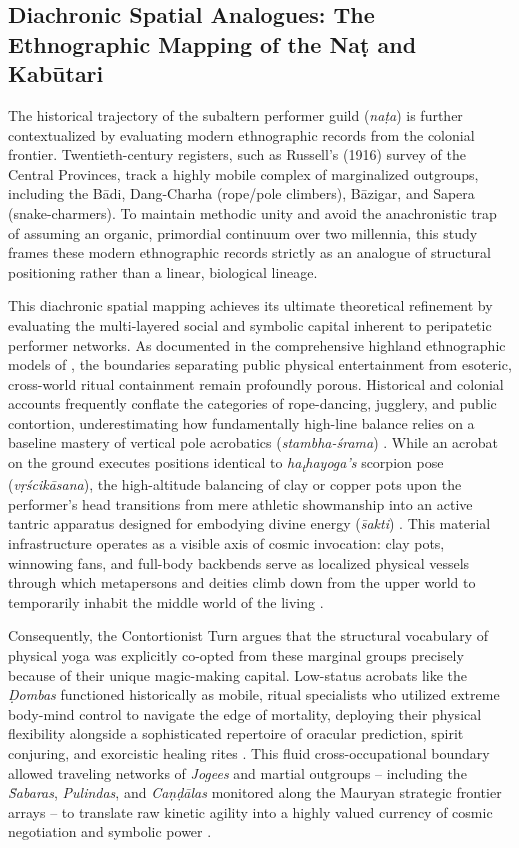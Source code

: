 \documentclass[11pt,twoside,letterpaper]{article}
\begin{document}
\subsection{Diachronic Spatial Analogues: The Ethnographic Mapping of the Naṭ and Kabūtari}

The historical trajectory of the subaltern performer guild (\textit{naṭa}) is further contextualized by evaluating modern ethnographic records from the colonial frontier. Twentieth-century registers, such as Russell’s (1916) survey of the Central Provinces, track a highly mobile complex of marginalized outgroups, including the Bādi, Dang-Charha (rope/pole climbers), Bāzigar, and Sapera (snake-charmers). To maintain methodic unity and avoid the anachronistic trap of assuming an organic, primordial continuum over two millennia, this study frames these modern ethnographic records strictly as an analogue of structural positioning rather than a linear, biological lineage.

This diachronic spatial mapping achieves its ultimate theoretical refinement by evaluating the multi-layered social and symbolic capital inherent to peripatetic performer networks. As documented in the comprehensive highland ethnographic models of \citet{Berger2023}, the boundaries separating public physical entertainment from esoteric, cross-world ritual containment remain profoundly porous. Historical and colonial accounts frequently conflate the categories of rope-dancing, jugglery, and public contortion, underestimating how fundamentally high-line balance relies on a baseline mastery of vertical pole acrobatics (\textit{stambha-śrama}) \citep{Berger2023}. While an acrobat on the ground executes positions identical to \textit{ha\textsubscript{t}hayoga's} scorpion pose (\textit{vṛścikāsana}), the high-altitude balancing of clay or copper pots upon the performer’s head transitions from mere athletic showmanship into an active tantric apparatus designed for embodying divine energy (\textit{s̄akti}) \citep{Berger2023}. This material infrastructure operates as a visible axis of cosmic invocation: clay pots, winnowing fans, and full-body backbends serve as localized physical vessels through which metapersons and deities climb down from the upper world to temporarily inhabit the middle world of the living \citep[397]{Berger2023}. 

Consequently, the Contortionist Turn argues that the structural vocabulary of physical yoga was explicitly co-opted from these marginal groups precisely because of their unique magic-making capital. Low-status acrobats like the \textit{Ḍombas} functioned historically as mobile, ritual specialists who utilized extreme body-mind control to navigate the edge of mortality, deploying their physical flexibility alongside a sophisticated repertoire of oracular prediction, spirit conjuring, and exorcistic healing rites \citep{Berger2023, Olivelle2011}. This fluid cross-occupational boundary allowed traveling networks of \textit{Jogees} and martial outgroups -- including the \textit{S̄abaras}, \textit{Pulindas}, and \textit{Caṇḍālas} monitored along the Mauryan strategic frontier arrays -- to translate raw kinetic agility into a highly valued currency of cosmic negotiation and symbolic power \citep{Kangle1969}. 
\end{document}
